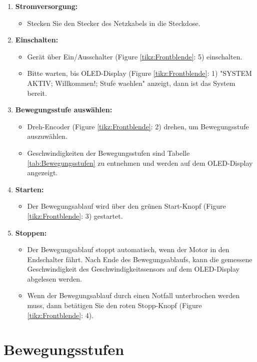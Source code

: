 \documentclass[12pt,a4paper]{scrbook}
\begin{document}
	\begin{enumerate}
		\item \textbf{Stromversorgung:}
		\begin{itemize}
			\item Stecken Sie den Stecker des Netzkabels in die Steckdose.
		\end{itemize}
		\item \textbf{Einschalten:}
		\begin{itemize}
			\item Gerät über Ein/Ausschalter (Figure \ref{tikz:Frontblende}: 5) einschalten.
			\item Bitte warten, bis OLED-Display (Figure \ref{tikz:Frontblende}: 1) "SYSTEM AKTIV; Willkommen!; Stufe waehlen" anzeigt, dann ist das System bereit.
		\end{itemize}
		\item \textbf{Bewegungsstufe auswählen:}
		\begin{itemize}
			\item Dreh-Encoder (Figure \ref{tikz:Frontblende}: 2) drehen, um Bewegungsstufe auszuwählen.
			\item Geschwindigkeiten der Bewegungsstufen sind Tabelle \ref{tab:Bewegungsstufen} zu entnehmen und werden auf dem OLED-Display angezeigt.
		\end{itemize}
		\item \textbf{Starten:}
		\begin{itemize}
			\item Der Bewegungsablauf wird über den grünen Start-Knopf (Figure \ref{tikz:Frontblende}: 3) gestartet.
		\end{itemize}
		\item \textbf{Stoppen:}
		\begin{itemize}
			\item Der Bewegungsablauf stoppt automatisch, wenn der Motor in den Endschalter fährt. Nach Ende des Bewegungsablaufs, kann die gemessene Geschwindigkeit des Geschwindigkeitssensors auf dem OLED-Display abgelesen werden. 
			\item Wenn der Bewegungsablauf durch einen Notfall unterbrochen werden muss, dann betätigen Sie den roten Stopp-Knopf (Figure \ref{tikz:Frontblende}: 4).
		\end{itemize}
	\end{enumerate}
	
		\section{Bewegungsstufen}
		
\end{document}
